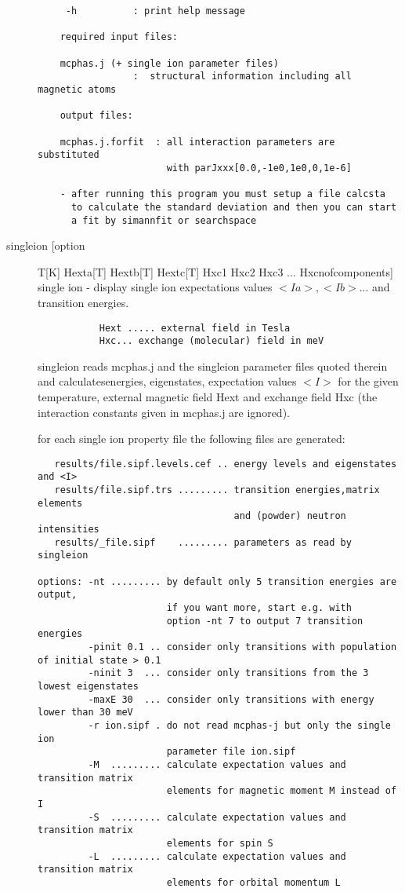 \begin{description}
\begin{verbatim}
     -h          : print help message

    required input files:

    mcphas.j (+ single ion parameter files)
                 :  structural information including all magnetic atoms

    output files:

    mcphas.j.forfit  : all interaction parameters are substituted
                       with parJxxx[0.0,-1e0,1e0,0,1e-6]

    - after running this program you must setup a file calcsta 
      to calculate the standard deviation and then you can start
      a fit by simannfit or searchspace
\end{verbatim}
\item [\prg singleion\index{singleion} [option] T[K] Hexta[T] Hextb[T] Hextc[T] Hxc1 Hxc2 Hxc3 ... Hxcnofcomponents]
 single ion  - display single ion expectations values $<Ia>, <Ib> $... and transition energies.
\begin{verbatim} 
           Hext ..... external field in Tesla 
           Hxc... exchange (molecular) field in meV   
\end{verbatim}
{\prg singleion} reads {\prg mcphas.j} and the singleion parameter files quoted therein
and calculatesenergies, eigenstates, expectation values $<I>$ for the given
temperature, external magnetic field Hext and exchange field Hxc (the
interaction constants given in mcphas.j are ignored).

for each single ion property file the following files are generated:
\begin{verbatim}
   results/file.sipf.levels.cef .. energy levels and eigenstates and <I>
   results/file.sipf.trs ......... transition energies,matrix elements
                                   and (powder) neutron intensities
   results/_file.sipf    ......... parameters as read by singleion

options: -nt ......... by default only 5 transition energies are output,
                       if you want more, start e.g. with 
                       option -nt 7 to output 7 transition energies
         -pinit 0.1 .. consider only transitions with population of initial state > 0.1
         -ninit 3  ... consider only transitions from the 3 lowest eigenstates
         -maxE 30  ... consider only transitions with energy lower than 30 meV
         -r ion.sipf . do not read mcphas-j but only the single ion
                       parameter file ion.sipf
         -M  ......... calculate expectation values and transition matrix
                       elements for magnetic moment M instead of I
         -S  ......... calculate expectation values and transition matrix
                       elements for spin S
         -L  ......... calculate expectation values and transition matrix
                       elements for orbital momentum L


\end{verbatim}
\end{description}
